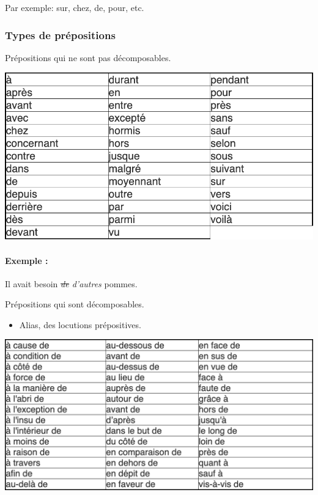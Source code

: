 \documentclass[10pt, french]{article}
\begin{document}
\begin{multicols*}{2}
\begin{definitionNOHFILL}[La préposition]
\tcbline

Par exemple:	sur, chez, de, pour, etc.
\end{definitionNOHFILL}

\subsubsection*{Types de prépositions}
\begin{definitionNOHFILLsub}
Prépositions qui ne sont pas décomposables.
\begin{center}
	\includegraphics[width=0.9\columnwidth]{prep-simple}
\end{center}
\begin{astuces}
\paragraph{Exemple :}	Il avait besoin \textit{\sout{de} d'autres} pommes.
\end{astuces}
\end{definitionNOHFILLsub}

\begin{definitionNOHFILLsub}
Prépositions qui sont décomposables.
\begin{itemize}
	\item	Alias, des locutions prépositives.
\end{itemize}
\begin{center}
	\includegraphics[width=0.9\columnwidth]{prep-compl}
\end{center}
\end{definitionNOHFILLsub}


\end{multicols*}
\end{document}
